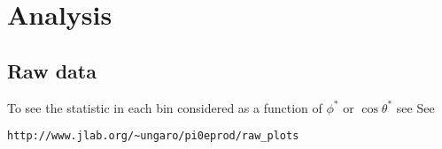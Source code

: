 \chapter{Analysis}
\resetfootnote

\pagestyle{fancy}
\renewcommand{\sectionmark}[1]{\markright{\bfseries \slshape \thesection\ #1}{}}
\fancyhead[R]{\rightmark}
\fancyhead[L]{\leftmark}
\fancyfoot[L]{}





\section{Raw data}
To see the statistic in each bin considered as a function of $\phi^*$ or $\cos\theta^*$
see
See    \begin{verbatim} 
http://www.jlab.org/~ungaro/pi0eprod/raw_plots
\end{verbatim}






%





%









